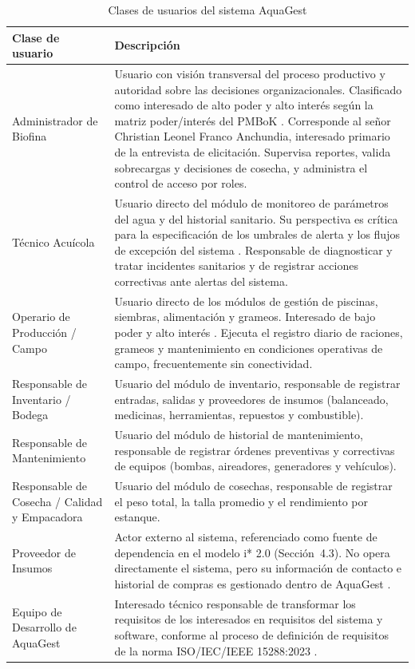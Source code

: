 \documentclass[12pt,a4paper]{article}
\begin{document}
\begin{longtable}{|p{3.6cm}|p{10.6cm}|}
\caption{Clases de usuarios del sistema AquaGest} \\
\hline
\textbf{Clase de usuario} & \textbf{Descripción} \\
\hline
\endfirsthead
\endhead
Administrador de Biofina &
Usuario con visión transversal del proceso productivo y autoridad sobre las
decisiones organizacionales. Clasificado como interesado de alto poder y alto
interés según la matriz poder/interés del PMBoK \cite{PMI2021}. Corresponde al
señor Christian Leonel Franco Anchundia, interesado primario de la entrevista de
elicitación. Supervisa reportes, valida sobrecargas y decisiones de cosecha, y
administra el control de acceso por roles. \\
\hline
Técnico Acuícola &
Usuario directo del módulo de monitoreo de parámetros del agua y del historial
sanitario. Su perspectiva es crítica para la especificación de los umbrales de
alerta y los flujos de excepción del sistema \cite{ISO29148:2018}. Responsable
de diagnosticar y tratar incidentes sanitarios y de registrar acciones
correctivas ante alertas del sistema. \\
\hline
Operario de Producción / Campo &
Usuario directo de los módulos de gestión de piscinas, siembras, alimentación y
grameos. Interesado de bajo poder y alto interés \cite{Robertson2012}. Ejecuta el
registro diario de raciones, grameos y mantenimiento en condiciones operativas
de campo, frecuentemente sin conectividad. \\
\hline
Responsable de Inventario / Bodega &
Usuario del módulo de inventario, responsable de registrar entradas, salidas y
proveedores de insumos (balanceado, medicinas, herramientas, repuestos y
combustible). \\
\hline
Responsable de Mantenimiento &
Usuario del módulo de historial de mantenimiento, responsable de registrar
órdenes preventivas y correctivas de equipos (bombas, aireadores, generadores y
vehículos). \\
\hline
Responsable de Cosecha / Calidad y Empacadora &
Usuario del módulo de cosechas, responsable de registrar el peso total, la
talla promedio y el rendimiento por estanque. \\
\hline
Proveedor de Insumos &
Actor externo al sistema, referenciado como fuente de dependencia en el modelo
i* 2.0 (Sección~4.3). No opera directamente el sistema, pero su información de
contacto e historial de compras es gestionado dentro de AquaGest
\cite{Yu1995}. \\
\hline
Equipo de Desarrollo de AquaGest &
Interesado técnico responsable de transformar los requisitos de los
interesados en requisitos del sistema y software, conforme al proceso de
definición de requisitos de la norma ISO/IEC/IEEE 15288:2023
\cite{ISO15288:2023}. \\
\hline
\end{longtable}
\end{document}
